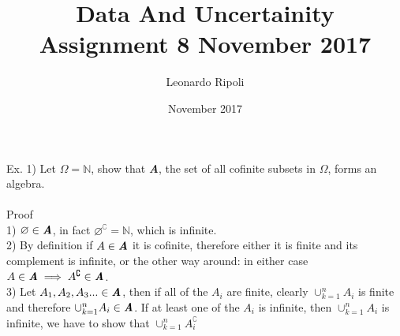 \documentclass[12pt,mythesisstyle]{report}
\title{Data And Uncertainity\\Assignment 8 November 2017}
\author{Leonardo Ripoli}
\date{November 2017}
\begin{document}
\begin{titlepage}
\maketitle
\end{titlepage}

Ex. 1) Let \(\Omega=\mathbb{N}\), show that \textbf{\textit{A}}, the set of all cofinite subsets in \(\Omega\), forms an algebra.
\\
\\Proof
\\
1) \(\varnothing\in\textbf{\textit{A}}\), in fact \(\varnothing^\complement=\mathbb{N}\), which is infinite.\\
2) By definition if \(A\in\textbf{\textit{A}}\) it is cofinite, therefore either it is finite and its complement is infinite, or the other way around: in either case \(A\in\textbf{\textit{A}}\implies A^\complement\in\textbf{\textit{A}}\).\\
3) Let \(A_1, A_2, A_3...\in\textbf{\textit{A}}\), then if all of the \(A_i\) are finite, clearly \(\cup_{k=1}^nA_i\) is finite and therefore \(\cup_{k=1}^nA_i\in\textbf{\textit{A}}\). If at least one of the \(A_i\) is infinite, then \(\cup_{k=1}^nA_i\) is infinite, we have to show that \(\cup_{k=1}^nA_i^\complement\) 
\end{document}
